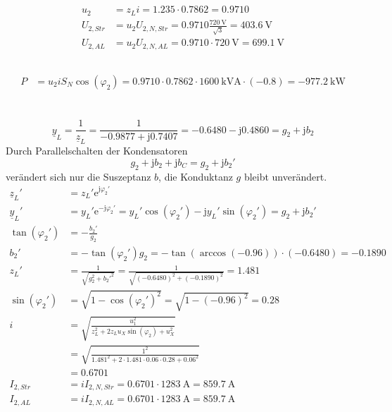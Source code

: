 \documentclass[11pt,a4paper]{scrartcl}
\newcommand{\mybr}[1]{\left(#1\right)}
\renewcommand{\j}{\mathrm{j}}
\newcommand{\z}{\underline{z}}
\newcommand{\y}{\underline{y}}
\newcommand{\0}{_{\mybr{0}}}
\newcommand{\1}{_{\mybr{1}}}
\newcommand{\2}{_{\mybr{2}}}
\newcommand{\USS}{U_{2,Str}}
\newcommand{\USA}{U_{2,AL}}
\newcommand{\ISS}{I_{2,Str}}
\newcommand{\ISA}{I_{2,AL}}
\newcommand{\USNS}{U_{2,N,Str}}
\newcommand{\USNA}{U_{2,N,AL}}
\newcommand{\ISNS}{I_{2,N,Str}}
\newcommand{\ISNA}{I_{2,N,AL}}
\newcommand{\cz}{\cos\mybr{\varphi_2}}
\newcommand{\sz}{\sin\mybr{\varphi_2}}
\renewcommand{\e}{\mathrm{e}}
\begin{document}
\subsection{}
\begin{align}
u_2&=z_L i=\num{1.235}\cdot\num{0.7862}=\num{0.9710}\\
\USS&=u_2\USNS=\num{0.9710}\frac{\SI{720}{\volt}}{\sqrt{3}}=\SI{403.6}{\volt}\\
\USA&=u_2\USNA=\num{0.9710}\cdot\SI{720}{\volt}=\SI{699.1}{\volt}
\end{align}

\subsection{}
\begin{align}
P&=u_2 i S_N \cz=\num{0.9710}\cdot\num{0.7862}\cdot\SI{1600}{\kilo\volt\ampere}\cdot\mybr{\num{-0.8}}=\SI{-977.2}{\kilo\watt}
\end{align}

\section{}
\subsection{}
\begin{equation}
\y_L=\frac{1}{\z_L}=\frac{1}{\num{-0.9877}+\j\num{0.7407}}=\num{-0.6480}-\j\num{0.4860}=g_2+\j b_2
\end{equation}
Durch Parallelschalten der Kondensatoren 
\begin{equation}
g_2+\j b_2+\j b_C=g_2+\j b_2'
\end{equation}
verändert sich nur die Suszeptanz $b$, die Konduktanz $g$ bleibt unverändert.
\begin{align}
\z_L'&=z_L'\e^{\j\varphi_2'}\\
\y_L'&=y_L'\e^{-\j\varphi_2'}=y_L'\cos\mybr{\varphi_2'}-\j y_L'\sin\mybr{\varphi_2'}=g_2+\j b_2'\\
\tan\mybr{\varphi_2'}&=-\frac{b_2'}{g_2}\\
b_2'&=-\tan\mybr{\varphi_2'}g_2=-\tan\mybr{\arccos\mybr{-0.96}}\cdot\mybr{-0.6480}=\num{-0.1890}\\
z_L'&=\frac{1}{\sqrt{g_2^2+b_2'^2}}=\frac{1}{\sqrt{\mybr{-0.6480}^2+\mybr{-0.1890}^2}}=\num{1.481}\\
\sin\mybr{\varphi_2'}&=\sqrt{1-\cos\mybr{\varphi_2'}^2}=\sqrt{1-\mybr{\num{-0.96}}^2}=\num{0.28}\\
i&=\sqrt{\frac{u_1^2}{z_L^2+2 z_L u_X \sz+u_X^2}}\\
&=\sqrt{\frac{1^2}{\num{1.481}^2+2\cdot\num{1.481}\cdot\num{0.06}\cdot\num{0.28}+\num{0.06}^2}}\\
&=\num{0.6701}\\
\ISS&=i\ISNS=\num{0.6701}\cdot\SI{1283}{\ampere}=\SI{859.7}{\ampere}\\
\ISA&=i\ISNA=\num{0.6701}\cdot\SI{1283}{\ampere}=\SI{859.7}{\ampere}
\end{align}
\end{document}
